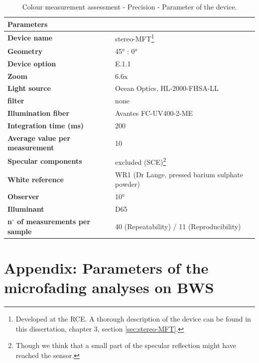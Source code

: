 \begin{appendices}
\begin{table}[!h]
\centering 
\caption*{Colour measurement assessment - Precision - Parameter of the device.}
\begin{tabular}{R{6cm}L{6cm}}
\toprule[0.4mm]
\textbf{Parameters} &  \\\midrule
\textbf{Device name} & stereo-MFT\footnote{Developed at the \gls{RCE}. A thorough description of the device can be found in this dissertation, chapter 3, section \ref{sec:stereo-MFT}.} \\
\textbf{Geometry} & \ang{45} : \ang{0}  \\
\textbf{Device option} & E.1.1 \\
\textbf{Zoom} & 6.6x \\
\textbf{Light source} & Ocean Optics,  HL-2000-FHSA-LL\\
\textbf{filter} & none \\
\textbf{Illumination fiber} & Avantes FC-UV400-2-ME \\
\textbf{Integration time (ms)} & 200 \\
\textbf{Average value per measurement} & 10 \\
\textbf{Specular components} & excluded (SCE)\footnote{Though we think that a small part of the specular reflection might have reached the sensor.} \\
\textbf{White reference} & WR1 (Dr Lange, pressed barium sulphate powder) \\
\textbf{Observer} & \ang{10} \\
\textbf{Illuminant} & D65 \\
\textbf{n$^\circ$ of measurements per sample} & 40 (Repeatability) / 11 (Reproducibility) \\
\bottomrule[0.4mm]
\end{tabular}
\label{tab:precision_methods_RS}
\end{table}



\newpage
\section[\hspace{0.3cm}Microfading analyses on BWS - Parameters]{ Appendix: Parameters of the microfading analyses on BWS}
\label{app:ch3_MFT_BWS_params}



\end{appendices}
